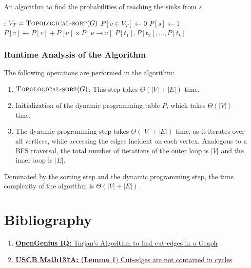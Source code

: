 \documentclass[12pt]{report}
\begin{document}
    \begin{algorithm}
        \caption{An algorithm to find the probabilities of reaching the sinks from $s$}
        \label{alg:sink-prob}
        \begin{algorithmic}[1]
            :
                \State $V_{T} = \Call{Topological-sort}{G}$
                \State $P[v \in V_{T}] \gets 0$
                \State $P[s] \gets 1$
                        \State $P[v] \gets P[v] + P[u] \times P[u \to v]$
                    \EndFor
                \EndFor
                \State \Return $P[t_{1}], P[t_{2}], \dots, P[t_{k}]$
            \EndProcedure
        \end{algorithmic}
    \end{algorithm}

    \subsubsection*{Runtime Analysis of the Algorithm}
    The following operations are performed in the algorithm:
    \begin{enumerate}
        \item $\Call{Topological-sort}{G}$: This step takes $\Theta(|V|+|E|)$ time.
        \item Initialization of the dynamic programming table $P$, which takes $\Theta(|V|)$ time.
        \item The dynamic programming step takes $\Theta(|V|+|E|)$ time, as it iterates over all vertices,
        while accessing the edges incident on each vertex.
        Analogous to a BFS traversal, the total number of iterations of the outer loop is $|V|$ and the inner loop is $|E|$.
    \end{enumerate}
    Dominated by the sorting step and the dynamic programming step, the time complexity of the algorithm is $\Theta(|V|+|E|)$.
    \vfill
    \pagebreak

    \section*{Bibliography}
    \begin{enumerate}
        \item
        \href{
            https://iq.opengenus.org/find-cut-edges-in-a-graph/#:~:text=A%
            }{\textbf{OpenGenius IQ:} Tarjan's Algorithm to find cut-edges in a Graph}
        \item
        \href{
            http://web.math.ucsb.edu/~padraic/ucsb_2013_14/math137a_w2014/math137a_w2014_lecture3.pdf
        }{\textbf{USCB Math137A: (Lemma 1}) Cut-edges are not contained in cycles}
    \end{enumerate}
\end{document}
